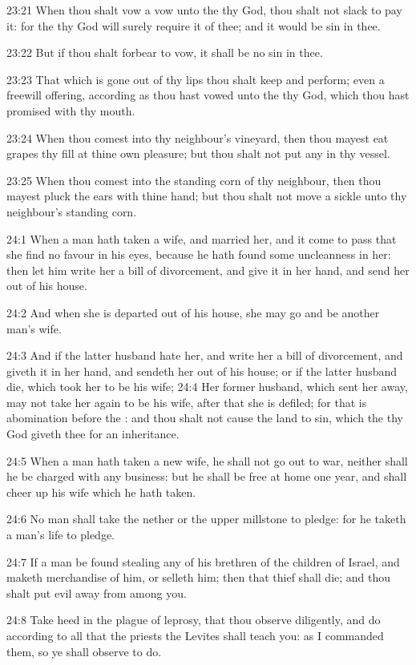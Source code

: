 23:21 When thou shalt vow a vow unto the \LORD thy God, thou shalt not
slack to pay it: for the \LORD thy God will surely require it of thee;
and it would be sin in thee.

23:22 But if thou shalt forbear to vow, it shall be no sin in thee.

23:23 That which is gone out of thy lips thou shalt keep and perform;
even a freewill offering, according as thou hast vowed unto the \LORD
thy God, which thou hast promised with thy mouth.

23:24 When thou comest into thy neighbour's vineyard, then thou mayest
eat grapes thy fill at thine own pleasure; but thou shalt not put any
in thy vessel.

23:25 When thou comest into the standing corn of thy neighbour, then
thou mayest pluck the ears with thine hand; but thou shalt not move a
sickle unto thy neighbour's standing corn.

24:1 When a man hath taken a wife, and married her, and it come to
pass that she find no favour in his eyes, because he hath found some
uncleanness in her: then let him write her a bill of divorcement, and
give it in her hand, and send her out of his house.

24:2 And when she is departed out of his house, she may go and be
another man's wife.

24:3 And if the latter husband hate her, and write her a bill of
divorcement, and giveth it in her hand, and sendeth her out of his
house; or if the latter husband die, which took her to be his wife;
24:4 Her former husband, which sent her away, may not take her again
to be his wife, after that she is defiled; for that is abomination
before the \LORD: and thou shalt not cause the land to sin, which the
\LORD thy God giveth thee for an inheritance.

24:5 When a man hath taken a new wife, he shall not go out to war,
neither shall he be charged with any business: but he shall be free at
home one year, and shall cheer up his wife which he hath taken.

24:6 No man shall take the nether or the upper millstone to pledge:
for he taketh a man's life to pledge.

24:7 If a man be found stealing any of his brethren of the children of
Israel, and maketh merchandise of him, or selleth him; then that thief
shall die; and thou shalt put evil away from among you.

24:8 Take heed in the plague of leprosy, that thou observe diligently,
and do according to all that the priests the Levites shall teach you:
as I commanded them, so ye shall observe to do.

